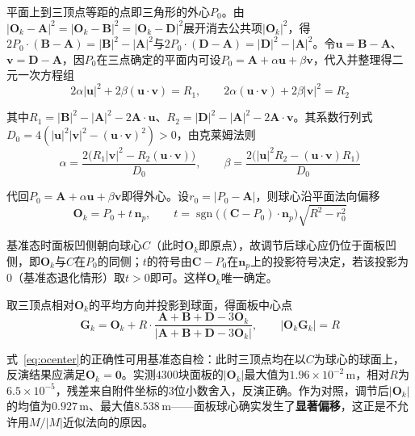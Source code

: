\documentclass[withoutpreface]{cumcmthesis}
\begin{document}
平面上到三顶点等距的点即三角形的外心$P_0$。由$|\mathbf{O}_k-\mathbf{A}|^{2}=|\mathbf{O}_k-\mathbf{B}|^{2}=|\mathbf{O}_k-\mathbf{D}|^{2}$展开消去公共项$|\mathbf{O}_k|^{2}$，得$2P_0\cdot(\mathbf{B}-\mathbf{A})=|\mathbf{B}|^{2}-|\mathbf{A}|^{2}$与$2P_0\cdot(\mathbf{D}-\mathbf{A})=|\mathbf{D}|^{2}-|\mathbf{A}|^{2}$。令$\mathbf{u}=\mathbf{B}-\mathbf{A}$、$\mathbf{v}=\mathbf{D}-\mathbf{A}$，因$P_0$在三点确定的平面内可设$P_0=\mathbf{A}+\alpha\mathbf{u}+\beta\mathbf{v}$，代入并整理得二元一次方程组
\begin{equation}
2\alpha|\mathbf{u}|^{2}+2\beta(\mathbf{u}\cdot\mathbf{v})=R_1,\qquad 2\alpha(\mathbf{u}\cdot\mathbf{v})+2\beta|\mathbf{v}|^{2}=R_2
\end{equation}

其中$R_1=|\mathbf{B}|^{2}-|\mathbf{A}|^{2}-2\mathbf{A}\cdot\mathbf{u}$、$R_2=|\mathbf{D}|^{2}-|\mathbf{A}|^{2}-2\mathbf{A}\cdot\mathbf{v}$。其系数行列式$D_0=4(|\mathbf{u}|^{2}|\mathbf{v}|^{2}-(\mathbf{u}\cdot\mathbf{v})^{2})>0$，由克莱姆法则
\begin{equation}
\alpha=\frac{2\bigl(R_1|\mathbf{v}|^{2}-R_2(\mathbf{u}\cdot\mathbf{v})\bigr)}{D_0},\qquad
\beta=\frac{2\bigl(|\mathbf{u}|^{2}R_2-(\mathbf{u}\cdot\mathbf{v})R_1\bigr)}{D_0}
\end{equation}

代回$P_0=\mathbf{A}+\alpha\mathbf{u}+\beta\mathbf{v}$即得外心。设$r_0=|P_0-\mathbf{A}|$，则球心沿平面法向偏移
\begin{equation}\label{eq:ocenter}
\mathbf{O}_k=P_0+t\,\mathbf{n}_p,\qquad t=\operatorname{sgn}\!\bigl((\mathbf{C}-P_0)\cdot\mathbf{n}_p\bigr)\sqrt{R^{2}-r_0^{2}}
\end{equation}

基准态时面板凹侧朝向球心$C$（此时$\mathbf{O}_k$即原点），故调节后球心应仍位于面板凹侧，即$\mathbf{O}_k$与$C$在$P_0$的同侧；$t$的符号由$\mathbf{C}-P_0$在$\mathbf{n}_p$上的投影符号决定，若该投影为$0$（基准态退化情形）取$t>0$即可。这样$\mathbf{O}_k$唯一确定。

取三顶点相对$\mathbf{O}_k$的平均方向并投影到球面，得面板中心点
\begin{equation}\label{eq:gcenter}
\mathbf{G}_k=\mathbf{O}_k+R\cdot\frac{\mathbf{A}+\mathbf{B}+\mathbf{D}-3\mathbf{O}_k}{\left|\mathbf{A}+\mathbf{B}+\mathbf{D}-3\mathbf{O}_k\right|},\qquad |\mathbf{O}_k\mathbf{G}_k|=R
\end{equation}

式~\eqref{eq:ocenter}的正确性可用基准态自检：此时三顶点均在以$C$为球心的球面上，反演结果应满足$\mathbf{O}_k=\mathbf{0}$。实测$4300$块面板的$|\mathbf{O}_k|$最大值为$1.96\times10^{-2}\,\mathrm{m}$，相对$R$为$6.5\times10^{-5}$，残差来自附件坐标的$3$位小数舍入，反演正确。作为对照，调节后$|\mathbf{O}_k|$的均值为$0.927\,\mathrm{m}$、最大值$8.538\,\mathrm{m}$——面板球心确实发生了\textbf{显著偏移}，这正是不允许用$M/|M|$近似法向的原因。
\end{document}

